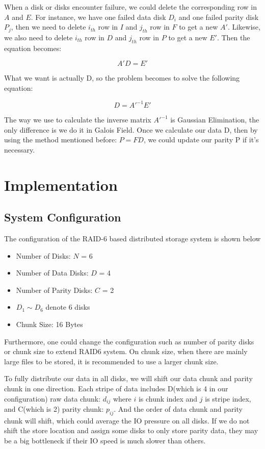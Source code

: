 \documentclass[journal]{IEEEtran}
\begin{document}
When a disk or disks encounter failure, we could delete the corresponding row in $A$ and $E$. For instance, we have one failed data disk $D_i$ and one failed parity disk $P_j$, then we need to delete $i_{th}$ row in $I$ and $j_{th}$ row in $F$ to get a new $A'$. Likewise, we also need to delete $i_{th}$ row in $D$ and $j_{th}$ row in $P$ to get a new $E'$. Then the equation becomes: 

\begin{equation}
A'D=E'
\end{equation}

What we want is actually D, so the problem becomes to solve the following equation:

\begin{equation}
D=A'^{-1}E'
\end{equation}

The way we use to calculate the inverse matrix $A'^{-1}$ is Gaussian Elimination, the only difference is we do it in Galois Field. Once we calculate our data D, then by using the method mentioned before: $P=FD$, we could update our parity P if it's necessary. 

\section{ Implementation}
\label{sec4}

\subsection{System Configuration}
The configuration of the RAID-6 based distributed storage system is shown below
\begin{itemize}
	\item Number of Disks: $N$ = 6
	\item Number of Data Disks: $D$ = 4
	\item Number of Parity Disks: $C$ = 2
	\item $D_1 \sim D_6$ denote 6 disks
	\item Chunk Size: 16 Bytes
\end{itemize}

Furthermore, one could change the configuration such as number of parity disks or chunk size to extend RAID6 system. On chunk size, when there are mainly large files to be stored, it is recommended to use a larger chunk size.

To fully distribute our data in all disks, we will shift our data chunk and parity chunk in one direction. Each stripe of data includes D(which is 4 in our configuration) raw data chunk: $d_{ij}$ where $i$ is chunk index and $j$ is stripe index, and C(which is 2) parity chunk: $p_{ij}$. And the order of data chunk and parity chunk will shift, which could average the IO pressure on all disks. If we do not shift the store location and assign some disks to only store parity data, they may be a big bottleneck if their IO speed is much slower than others.
\end{document}
